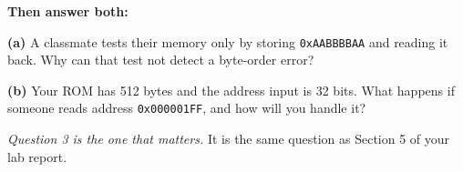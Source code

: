 \documentclass[11pt]{article}
\newcommand{\code}[1]{\texttt{#1}}
\newcommand{\answerbox}[1]{\vspace{2pt}\fbox{\parbox[c][#1][c]{\dimexpr\linewidth-2\fboxsep-2\fboxrule}{\ }}\vspace{4pt}}
\begin{document}
\textbf{Then answer both:}

\textbf{(a)} A classmate tests their memory only by storing \code{0xAABBBBAA}
and reading it back. Why can that test not detect a byte-order error?

\answerbox{1.6cm}

\textbf{(b)} Your ROM has 512 bytes and the address input is 32 bits. What
happens if someone reads address \code{0x000001FF}, and how will you handle it?

\answerbox{2.0cm}

\vfill
{\small\emph{Question 3 is the one that matters.} It is the same question as
Section 5 of your lab report.}
\end{document}
